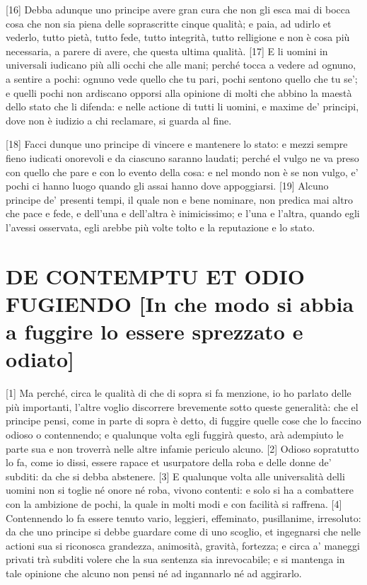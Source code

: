 {[}16{]} Debba adunque uno principe avere gran cura che non gli esca mai
di bocca cosa che non sia piena delle soprascritte cinque qualità; e
paia, ad udirlo et vederlo, tutto pietà, tutto fede, tutto integrità,
tutto relligione e non è cosa più necessaria, a parere di avere, che
questa ultima qualità. {[}17{]} E li uomini in universali iudicano più
alli occhi che alle mani; perché tocca a vedere ad ognuno, a sentire a
pochi: ognuno vede quello che tu pari, pochi sentono quello che tu se';
e quelli pochi non ardiscano opporsi alla opinione di molti che abbino
la maestà dello stato che li difenda: e nelle actione di tutti li
uomini, e maxime de' principi, dove non è iudizio a chi reclamare, si
guarda al fine.

{[}18{]} Facci dunque uno principe di vincere e mantenere lo stato: e
mezzi sempre fieno iudicati onorevoli e da ciascuno saranno laudati;
perché el vulgo ne va preso con quello che pare e con lo evento della
cosa: e nel mondo non è se non vulgo, e' pochi ci hanno luogo quando gli
assai hanno dove appoggiarsi. {[}19{]} Alcuno principe de' presenti
tempi, il quale non e bene nominare, non predica mai altro che pace e
fede, e dell'una e dell'altra è inimicissimo; e l'una e l'altra, quando
egli l'avessi osservata, egli arebbe più volte tolto e la reputazione e
lo stato.

\quebra\section{DE CONTEMPTU ET ODIO FUGIENDO\break
{[}In che modo si abbia a fuggire lo essere sprezzato e odiato{]}}

{[}1{]} Ma perché, circa le qualità di che di sopra si fa menzione, io
ho parlato delle più importanti, l'altre voglio discorrere brevemente
sotto queste generalità: che el principe pensi, come in parte di sopra è
detto, di fuggire quelle cose che lo faccino odioso o contennendo; e
qualunque volta egli fuggirà questo, arà adempiuto le parte sua e non
troverrà nelle altre infamie periculo alcuno. {[}2{]} Odioso sopratutto
lo fa, come io dissi, essere rapace et usurpatore della roba e delle
donne de' subditi: da che si debba abstenere. {[}3{]} E qualunque volta
alle universalità delli uomini non si toglie né onore né roba, vivono
contenti: e solo si ha a combattere con la ambizione de pochi, la quale
in molti modi e con facilità si raffrena. {[}4{]} Contennendo lo fa
essere tenuto vario, leggieri, effeminato, pusillanime, irresoluto: da
che uno principe si debbe guardare come di uno scoglio, et ingegnarsi
che nelle actioni sua si riconosca grandezza, animosità, gravità,
fortezza; e circa a' maneggi privati trà subditi volere che la sua
sentenza sia inrevocabile; e si mantenga in tale opinione che alcuno non
pensi né ad ingannarlo né ad aggirarlo.

